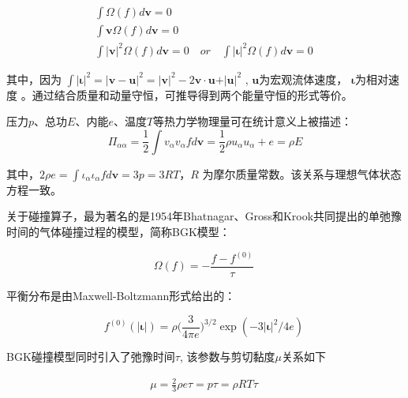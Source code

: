 \documentclass[LBMDerivation.tex]{subfiles}
\begin{document}
\begin{equation}
  \begin{aligned}
    \int  \Omega \left( f \right) d\boldsymbol{v} =0                \\
    \int \boldsymbol{v}  \Omega \left( f \right) d\boldsymbol{v} =0 \\
    \int  \vert \boldsymbol{v}  \vert ^{2} \Omega \left( f \right) d\boldsymbol{v} =0 \quad or \quad  \int\vert \boldsymbol{\iota}\vert^2 \Omega \left( f \right) d\boldsymbol{v} =0
  \end{aligned}
  \label{EQUATION::碰撞算子三个守恒} ~
\end{equation}




其中，因为 $ \int\vert \boldsymbol{\iota}\vert^2 =\vert \boldsymbol{v} -\boldsymbol{u} \vert^2 = \vert \boldsymbol{v}  \vert ^{2}-2\boldsymbol{v} \cdot \boldsymbol{u}+ \vert \boldsymbol{u} \vert ^{2}$ , $\boldsymbol{u}$为宏观流体速度， $\boldsymbol{\iota}$为相对速度 。通过结合质量和动量守恒，可推导得到两个能量守恒的形式等价。



压力$p$、总功$E$、内能$e$、温度$T$等热力学物理量可在统计意义上被描述：
\begin{equation}
  \Pi _{ \alpha  \alpha }= \frac{1}{2}\int v_{ \alpha } v_{ \alpha }fd\boldsymbol{v} = \frac{1}{2}\rho u_\alpha u_\alpha + e  =\rho E
\end{equation}

其中，$2\rho e= \int \iota_{ \alpha } \iota_{ \alpha }fd\boldsymbol{v} = 3p =3RT$，$R$ 为摩尔质量常数。该关系与理想气体状态方程一致。


关于碰撞算子，最为著名的是1954年Bhatnagar、Gross和Krook共同提出的单弛豫时间的气体碰撞过程的模型，简称BGK模型：

\begin{equation}
  \boxed{
  \Omega(f)= -\frac{f-f^{(0)}}{\tau}
  }
  \label{EQUATION::BGK模型1} ~
\end{equation}

平衡分布是由Maxwell-Boltzmann形式给出的：

\begin{equation}
  \boxed{
    f^{(0)}(| \boldsymbol{\iota}|) = \rho {(\frac{3}{4\pi e}})^{3/2} \exp({-3| \boldsymbol{\iota}|^2/4e})
  }
  \label{EQUATION::平衡分布} ~
\end{equation}


BGK碰撞模型同时引入了弛豫时间$\tau$, 该参数与剪切黏度$\mu$关系如下

\begin{equation}
  \begin{aligned}
    \mu=\frac{2}{3} \rho e \tau=p \tau=\rho R T \tau
  \end{aligned}
  \label{EQUATION::viscosity} ~
\end{equation}
\end{document}
